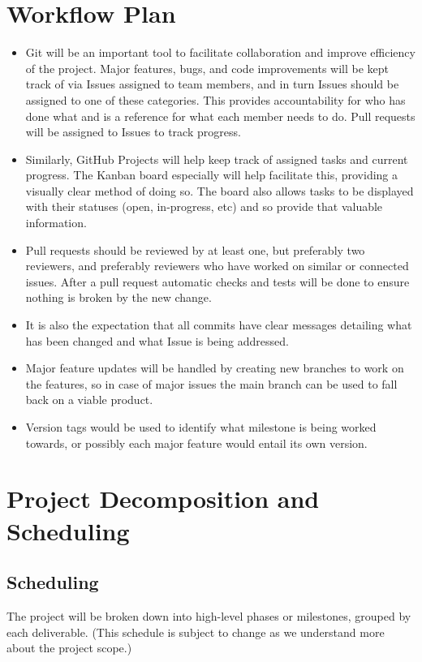 \documentclass{article}
\begin{document}
\section{Workflow Plan}

\begin{itemize}
	\item Git will be an important tool to facilitate collaboration and improve efficiency of the project. Major features, bugs, and code improvements will be kept track of via Issues assigned to team members, and in turn Issues should be assigned to one of these categories. This provides accountability for who has done what and is a reference for what each member needs to do. Pull requests will be assigned to Issues to track progress.
	\item Similarly, GitHub Projects will help keep track of assigned tasks and current progress. The Kanban board especially will help facilitate this, providing a visually clear method of doing so. The board also allows tasks to be displayed with their statuses (open, in-progress, etc) and so provide that valuable information.
    \item Pull requests should be reviewed by at least one, but preferably two reviewers, and preferably reviewers who have worked on similar or connected issues. After a pull request automatic checks and tests will be done to ensure nothing is broken by the new change.
    \item It is also the expectation that all commits have clear messages detailing what has been changed and what Issue is being addressed.
    \item Major feature updates will be handled by creating new branches to work on the features, so in case of major issues the main branch can be used to fall back on a viable product.
    \item Version tags would be used to identify what milestone is being worked towards, or possibly each major feature would entail its own version. 
\end{itemize}

\section{Project Decomposition and Scheduling}

\subsection*{Scheduling}
The project will be broken down into high-level phases or milestones, grouped by each deliverable. (This schedule is subject to change as we understand more about the project scope.)
\end{document}
